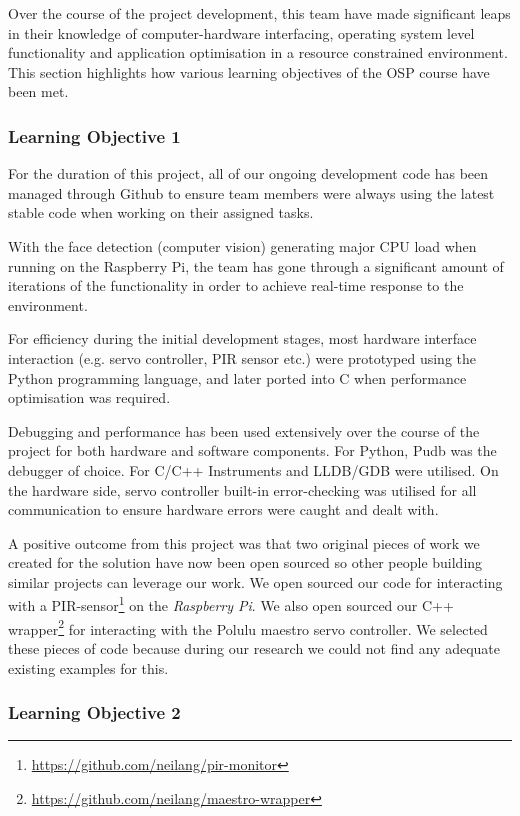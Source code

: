 \documentclass[11pt,a4paper,titlepage]{report}
\newcommand{\rpi}{\textit{Raspberry Pi\textsuperscript{\textregistered}}}
\begin{document}
Over the course of the project development, this team have made significant leaps in their knowledge of computer-hardware interfacing, operating system level functionality and application optimisation in a resource constrained environment. This section highlights how various learning objectives of the OSP course have been met.
 
\subsubsection{Learning Objective 1}
For the duration of this project, all of our ongoing development code has been managed through Github to ensure team members were always using the latest stable code when working on their assigned tasks.

With the face detection (computer vision) generating major CPU load when running on the Raspberry Pi, the team has gone through a significant amount of iterations of the functionality in order to achieve real-time response to the environment.


For efficiency during the initial development stages, most hardware interface interaction (e.g. servo controller, PIR sensor etc.) were prototyped using the Python programming language, and later ported into C when performance optimisation was required.


Debugging and performance has been used extensively over the course of the project for both hardware and software components. For Python, Pudb was the debugger of choice. For C/C++ Instruments and LLDB/GDB were utilised. On the hardware side, servo controller built-in error-checking was utilised for all communication to ensure hardware errors were caught and dealt with.

A positive outcome from this project was that two original pieces of work we created for the solution have now been open sourced so other people building similar projects can leverage our work. We open sourced our code for interacting with a PIR-sensor\footnote{\url{https://github.com/neilang/pir-monitor}} on the \rpi. We also open sourced our C++ wrapper\footnote{\url{https://github.com/neilang/maestro-wrapper}} for interacting with the Polulu maestro servo controller. We selected these pieces of code because during our research we could not find any adequate existing examples for this.



 
\subsubsection{Learning Objective 2}
\end{document}
